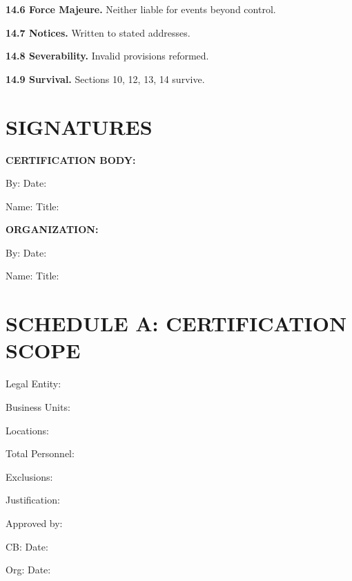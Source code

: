 \documentclass[11pt,a4paper]{article}
\begin{document}
\textbf{14.6 Force Majeure.} Neither liable for events beyond control.

\textbf{14.7 Notices.} Written to stated addresses.

\textbf{14.8 Severability.} Invalid provisions reformed.

\textbf{14.9 Survival.} Sections 10, 12, 13, 14 survive.

\section*{SIGNATURES}

\textbf{CERTIFICATION BODY:}

By: \underline{\hspace{6cm}} Date: \underline{\hspace{3cm}}

Name: \underline{\hspace{6cm}} Title: \underline{\hspace{6cm}}

\vspace{2em}

\textbf{ORGANIZATION:}

By: \underline{\hspace{6cm}} Date: \underline{\hspace{3cm}}

Name: \underline{\hspace{6cm}} Title: \underline{\hspace{6cm}}

\newpage

\section*{SCHEDULE A: CERTIFICATION SCOPE}

Legal Entity: \underline{\hspace{12cm}}

Business Units: \underline{\hspace{12cm}}

Locations: \underline{\hspace{12cm}}

Total Personnel: \underline{\hspace{4cm}}

Exclusions: \underline{\hspace{12cm}}

Justification: \underline{\hspace{12cm}}

Approved by:

CB: \underline{\hspace{5cm}} Date: \underline{\hspace{3cm}}

Org: \underline{\hspace{5cm}} Date: \underline{\hspace{3cm}}
\end{document}
